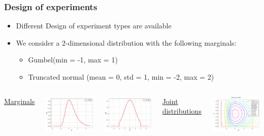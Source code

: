\documentclass[aspectratio=169]{beamer}
\begin{document}
\begin{frame}[containsverbatim]
\frametitle{Design of experiments}

\scriptsize{

\begin{itemize}
\item  Different Design of experiment types are available
\item We consider a 2-dimensional distribution with the following marginals: 
\begin{itemize}
\tiny
\item Gumbel(min = -1, max = 1)
\item Truncated normal (mean = 0, std = 1, min = -2, max = 2)
\end{itemize}
\end{itemize}

\begin{columns}

\underline{Marginals}

    \includegraphics[width=.45\textwidth]{figures/Marg1.pdf}

    \includegraphics[width=.45\textwidth]{figures/Marg2.pdf}


    
\underline{Joint distributions}

    \includegraphics[width=1\textwidth]{figures/Dist.pdf}


\end{columns}}
\end{frame}
\end{document}
